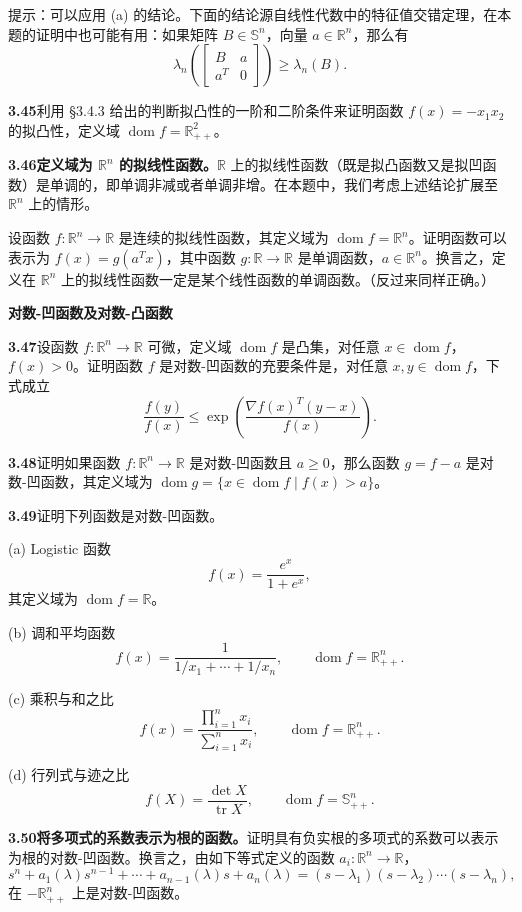 \documentclass[UTF8, 12pt, fontset=fandol, oneside]{ctexart}
\DeclareMathOperator{\dom}{dom}
\begin{document}
提示：可以应用 (a) 的结论。下面的结论源自线性代数中的特征值交错定理，在本题的证明中也可能有用：如果矩阵 $B\in\mathbb{S}^n$，向量 $a\in\mathbb{R}^n$，那么有
\[
\lambda_n\left(
\begin{bmatrix}
B & a\\
a^T & 0
\end{bmatrix}
\right)\geq \lambda_n(B).
\]

\noindent\textbf{3.45}\quad 利用 \S3.4.3 给出的判断拟凸性的一阶和二阶条件来证明函数 $f(x)=-x_1x_2$ 的拟凸性，定义域 $\dom f=\mathbb{R}_{++}^2$。

\noindent\textbf{3.46\quad 定义域为 $\mathbb{R}^n$ 的拟线性函数。}\quad $\mathbb{R}$ 上的拟线性函数（既是拟凸函数又是拟凹函数）是单调的，即单调非减或者单调非增。在本题中，我们考虑上述结论扩展至 $\mathbb{R}^n$ 上的情形。

设函数 $f:\mathbb{R}^n\to\mathbb{R}$ 是连续的拟线性函数，其定义域为 $\dom f=\mathbb{R}^n$。证明函数可以表示为 $f(x)=g(a^Tx)$，其中函数 $g:\mathbb{R}\to\mathbb{R}$ 是单调函数，$a\in\mathbb{R}^n$。换言之，定义在 $\mathbb{R}^n$ 上的拟线性函数一定是某个线性函数的单调函数。（反过来同样正确。）

\noindent\textbf{对数-凹函数及对数-凸函数}

\noindent\textbf{3.47}\quad 设函数 $f:\mathbb{R}^n\to\mathbb{R}$ 可微，定义域 $\dom f$ 是凸集，对任意 $x\in\dom f$，$f(x)>0$。证明函数 $f$ 是对数-凹函数的充要条件是，对任意 $x,y\in\dom f$，下式成立
\[
\frac{f(y)}{f(x)}\leq \exp\left(\frac{\nabla f(x)^T(y-x)}{f(x)}\right).
\]

\noindent\textbf{3.48}\quad 证明如果函数 $f:\mathbb{R}^n\to\mathbb{R}$ 是对数-凹函数且 $a\geq0$，那么函数 $g=f-a$ 是对数-凹函数，其定义域为 $\dom g=\{x\in\dom f\mid f(x)>a\}$。

\noindent\textbf{3.49}\quad 证明下列函数是对数-凹函数。

(a) Logistic 函数
\[
f(x)=\frac{e^x}{1+e^x},
\]
其定义域为 $\dom f=\mathbb{R}$。

(b) 调和平均函数
\[
f(x)=\frac{1}{1/x_1+\cdots+1/x_n},\qquad \dom f=\mathbb{R}_{++}^n.
\]

(c) 乘积与和之比
\[
f(x)=\frac{\prod_{i=1}^n x_i}{\sum_{i=1}^n x_i},\qquad \dom f=\mathbb{R}_{++}^n.
\]

(d) 行列式与迹之比
\[
f(X)=\frac{\det X}{\operatorname{tr}X},\qquad \dom f=\mathbb{S}_{++}^n.
\]

\noindent\textbf{3.50\quad 将多项式的系数表示为根的函数。}\quad 证明具有负实根的多项式的系数可以表示为根的对数-凹函数。换言之，由如下等式定义的函数 $a_i:\mathbb{R}^n\to\mathbb{R}$，
\[
s^n+a_1(\lambda)s^{n-1}+\cdots+a_{n-1}(\lambda)s+a_n(\lambda)=(s-\lambda_1)(s-\lambda_2)\cdots(s-\lambda_n),
\]
在 $-\mathbb{R}_{++}^n$ 上是对数-凹函数。
\end{document}
